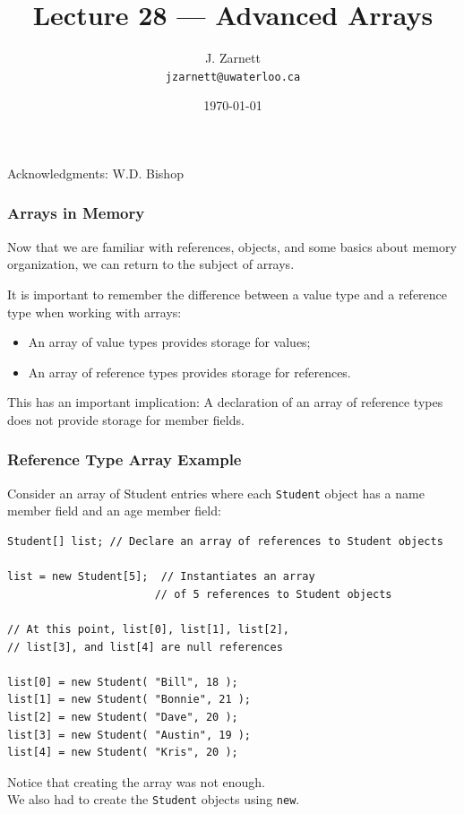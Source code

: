 

\title{Lecture 28 --- Advanced Arrays }

\author{J. Zarnett\\
\texttt{jzarnett@uwaterloo.ca}}
\date{\today}



\begin{frame}
  \titlepage
  
  \begin{center}
  \small{Acknowledgments: W.D. Bishop}
  \end{center}
\end{frame}


\begin{frame}
\frametitle{Arrays in Memory}
Now that we are familiar with references, objects, and some basics about memory organization, we can return to the subject of arrays.

It is important to remember the difference between a value type and a reference type when working with arrays:\\
\begin{itemize}
	\item An array of value types provides storage for values;\\
	\item An array of reference types provides storage for references.
\end{itemize}

This has an important implication:
A declaration of an array of reference types does not provide storage for member fields.

\end{frame}

\begin{frame}[fragile]
\frametitle{Reference Type Array Example}

Consider an array of Student entries where each \texttt{Student} object has a name member field and an age member field:

{\scriptsize
\begin{verbatim}
Student[] list;	// Declare an array of references to Student objects

list = new Student[5];	// Instantiates an array 
                       // of 5 references to Student objects
	
// At this point, list[0], list[1], list[2], 
// list[3], and list[4] are null references

list[0] = new Student( "Bill", 18 );
list[1] = new Student( "Bonnie", 21 );
list[2] = new Student( "Dave", 20 );
list[3] = new Student( "Austin", 19 );
list[4] = new Student( "Kris", 20 );
\end{verbatim}
}
Notice that creating the array was not enough.\\
\quad We also had to create the \texttt{Student} objects using \texttt{new}.

\end{frame}

